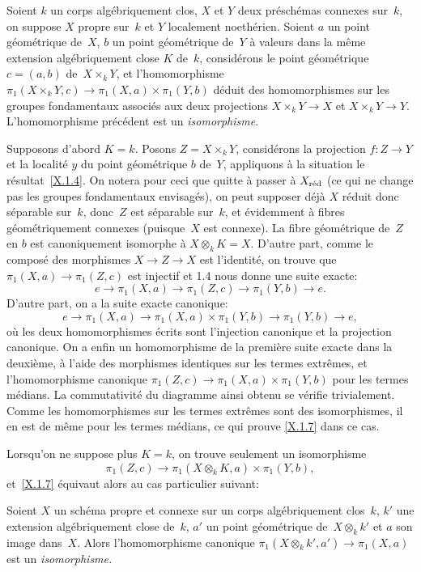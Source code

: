 \begin{corollaire}
\label{X.1.7}
Soient $k$ un corps alg\'ebriquement clos, $X$ et $Y$ deux
pr\'esch\'emas connexes sur~$k$, on suppose $X$ propre sur~$k$ et
$Y$ localement
noeth\'erien. Soient $a$ un point g\'eom\'etrique de~$X$, $b$
un point g\'eom\'etrique de~$Y$ \`a valeurs dans la m\^eme
extension alg\'ebriquement close $K$ de~$k$, consid\'erons le
point g\'eom\'etrique $c=(a,b)$ de~$X\times_k Y$, et
l'homomorphisme $\pi_1(X\times_k Y,c)\to \pi_1(X,a)\times\pi_1(Y,b)$
d\'eduit des homomorphismes sur les groupes fondamentaux
associ\'es aux deux projections $X\times_k Y\to X$ et $X\times_k
Y\to Y$. L'homomorphisme pr\'ec\'edent est un \emph{isomorphisme}.
\end{corollaire}

Supposons d'abord $K=k$. Posons $Z=X\times_k Y$, consid\'erons la
projection $f\colon Z\to Y$ et la localit\'e $y$ du point
g\'eom\'etrique $b$ de~$Y$, appliquons \`a la situation le
r\'esultat~\ref{X.1.4}. On notera pour ceci que quitte \`a passer
\`a $X_{\mathrm{r\acute{e}d}}$ (ce qui ne change pas les groupes fondamentaux
envisag\'es), on peut supposer d\'ej\`a $X$ r\'eduit donc
s\'eparable sur~$k$, donc~$Z$ est s\'eparable sur~$k$, et
\'evidemment \`a fibres g\'eom\'etriquement connexes (puisque~$X$ est connexe). La fibre g\'eom\'etrique de~$Z$ en $b$ est
canoniquement isomorphe \`a $X\otimes_k K=X$. D'autre part, comme le
compos\'e des morphismes $X\to Z\to X$ est l'identit\'e, on trouve
que $\pi_1(X,a)\to \pi_1(Z,c)$ est injectif et 1.4 nous donne une
suite exacte:
$$
e\to \pi_1(X,a)\to \pi_1(Z,c)\to \pi_1(Y,b)\to e.
$$
D'autre part, on a la suite exacte canonique:
$$
e\to \pi_1(X,a)\to \pi_1(X,a)\times \pi_1(Y,b)\to \pi_1(Y,b)\to e,
$$
o\`u les deux homomorphismes \'ecrits sont l'injection canonique
et la projection canonique. On a enfin un homomorphisme de la
premi\`ere suite exacte dans la deuxi\`eme, \`a l'aide des
morphismes identiques sur les termes extr\^emes, et l'homomorphisme
canonique $\pi_1(Z,c)\to \pi_1(X,a)\times\pi_1(Y,b)$ pour les termes
m\'edians. La commutativit\'e du diagramme ainsi obtenu se
v\'erifie trivialement. Comme les homomorphismes sur les termes
extr\^emes sont des isomorphismes, il en est de m\^eme pour les
termes m\'edians, ce qui prouve \ref{X.1.7} dans ce cas.

Lorsqu'on ne suppose plus $K=k$, on trouve seulement un isomorphisme
$$
\pi_1(Z,c)\to \pi_1(X\otimes_k K,a)\times \pi_1(Y,b),
$$
et~\ref{X.1.7} \'equivaut alors au cas particulier suivant:

\begin{corollaire}
\label{X.1.8}
Soient $X$ un sch\'ema propre et connexe sur un corps
alg\'ebriquement clos~$k$, $k'$ une extension alg\'ebriquement
close de~$k$, $a'$ un point g\'eom\'etrique de~$X\otimes_k k'$ et
$a$ son image dans~$X$. Alors l'homomorphisme canonique
$\pi_1(X\otimes_k k',a')\to \pi_1(X,a)$ est un \emph{isomorphisme.}
\end{corollaire}

